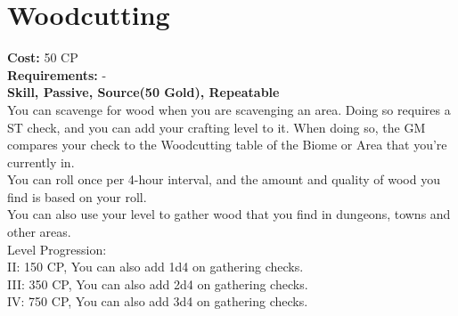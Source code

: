 \section{Woodcutting}\label{perk:woodcutting}
\textbf{Cost:} 50 CP\\
\textbf{Requirements:} -\\
\textbf{Skill, Passive, Source(50 Gold), Repeatable}\\
You can scavenge for wood when you are scavenging an area.
Doing so requires a ST check, and you can add your crafting level to it.
When doing so, the GM compares your check to the Woodcutting table of the Biome or Area that you're currently in.\\
You can roll once per 4-hour interval, and the amount and quality of wood you find is based on your roll.\\
You can also use your level to gather wood that you find in dungeons, towns and other areas.
\\
Level Progression:\\
II: 150 CP, You can also add 1d4 on gathering checks.\\
III: 350 CP, You can also add 2d4 on gathering checks.\\
IV: 750 CP, You can also add 3d4 on gathering checks.\\